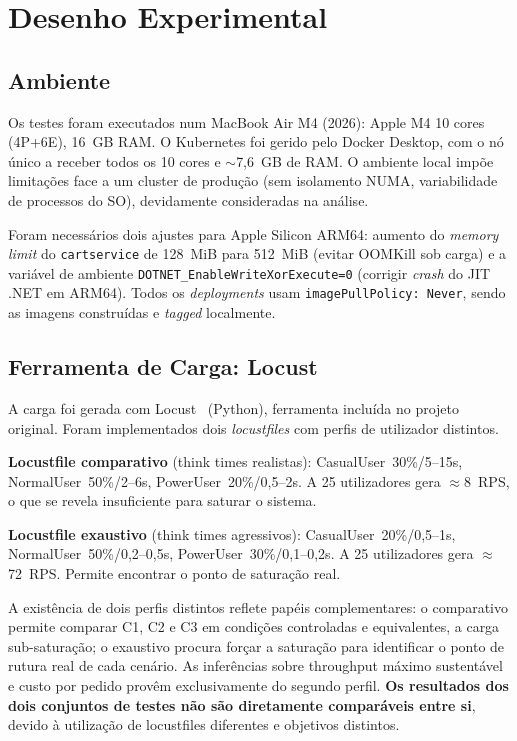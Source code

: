 \documentclass[manuscript,oneside]{acmart}
\begin{document}
\section{Desenho Experimental}
\label{sec:metodologia}

\subsection{Ambiente}

Os testes foram executados num MacBook Air M4 (2026): Apple M4 10 cores (4P+6E), 16~GB RAM. O Kubernetes foi gerido pelo Docker Desktop, com o nó único a receber todos os 10 cores e $\sim$7,6~GB de RAM. O ambiente local impõe limitações face a um cluster de produção (sem isolamento NUMA, variabilidade de processos do SO), devidamente consideradas na análise.

Foram necessários dois ajustes para Apple Silicon ARM64: aumento do \textit{memory limit} do \texttt{cartservice} de 128~MiB para 512~MiB (evitar OOMKill sob carga) e a variável de ambiente \texttt{DOTNET\_EnableWriteXorExecute=0} (corrigir \textit{crash} do JIT .NET em ARM64). Todos os \textit{deployments} usam \texttt{imagePullPolicy: Never}, sendo as imagens construídas e \textit{tagged} localmente.

\subsection{Ferramenta de Carga: Locust}

A carga foi gerada com Locust~\cite{locust} (Python), ferramenta incluída no projeto original. Foram implementados dois \textit{locustfiles} com perfis de utilizador distintos.

\textbf{Locustfile comparativo} (think times realistas): CasualUser~30\%/5--15s, NormalUser~50\%/2--6s, PowerUser~20\%/0,5--2s. A 25 utilizadores gera $\approx$8~RPS, o que se revela insuficiente para saturar o sistema.

\textbf{Locustfile exaustivo} (think times agressivos): CasualUser~20\%/0,5--1s, NormalUser~50\%/0,2--0,5s, PowerUser~30\%/0,1--0,2s. A 25 utilizadores gera $\approx$72~RPS. Permite encontrar o ponto de saturação real.

A existência de dois perfis distintos reflete papéis complementares: o comparativo permite comparar C1, C2 e C3 em condições controladas e equivalentes, a carga sub-saturação; o exaustivo procura forçar a saturação para identificar o ponto de rutura real de cada cenário. As inferências sobre throughput máximo sustentável e custo por pedido provêm exclusivamente do segundo perfil. \textbf{Os resultados dos dois conjuntos de testes não são diretamente comparáveis entre si}, devido à utilização de locustfiles diferentes e objetivos distintos.
\end{document}
